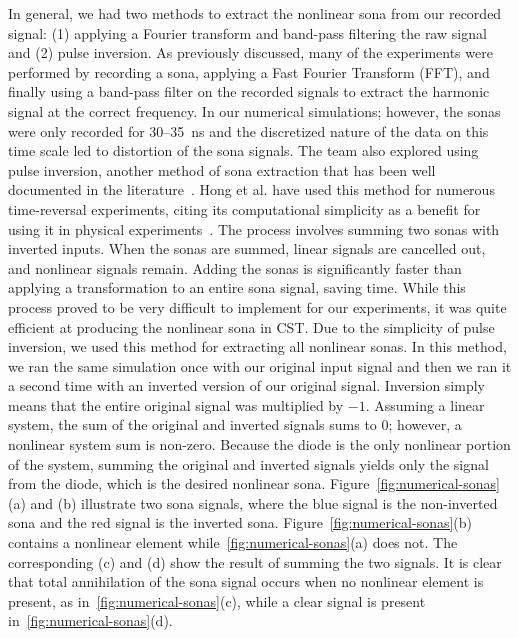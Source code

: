 In general, we had two methods to extract the nonlinear sona from our recorded signal: (1) applying a Fourier transform and band-pass filtering the raw signal and (2) pulse inversion. As previously discussed, many of the \giga experiments were performed by recording a sona, applying a Fast Fourier Transform (FFT), and finally using a band-pass filter on the recorded signals to extract the harmonic signal at the correct frequency. In our numerical simulations; however, the sonas were only recorded for \numrange{30}{35}~ns and the discretized nature of the data on this time scale led to distortion of the sona signals.
The team also explored using pulse inversion, another method of sona extraction that has been well documented in the literature~\cite{simpson_pulse_1999,hong_nonlinear_2014}. Hong et al. have used this method for numerous time-reversal experiments, citing its computational simplicity as a benefit for using it in physical experiments~\cite{hong_nonlinear_2014}. The process involves summing two sonas with inverted inputs.  When the sonas are summed, linear signals are cancelled out, and nonlinear signals remain. Adding the sonas is significantly faster than applying a transformation to an entire sona signal, saving time. While this process proved to be very difficult to implement for our \giga experiments, it was quite efficient at producing the nonlinear sona in CST.
Due to the simplicity of pulse inversion, we used this method for extracting all nonlinear sonas. In this method, we ran the same simulation once with our original input signal and then we ran it a second time with an inverted version of our original signal. Inversion simply means that the entire original signal was multiplied by $-1$. Assuming a linear system, the sum of the original and inverted signals sums to $0$; however, a nonlinear system sum is non-zero. Because the diode is the only nonlinear portion of the system, summing the original and inverted signals yields only the signal from the diode, which is the desired nonlinear sona. Figure~\ref{fig:numerical-sonas}(a) and (b) illustrate two sona signals, where the blue signal is the non-inverted sona and the red signal is the inverted sona. Figure~\ref{fig:numerical-sonas}(b) contains a nonlinear element while~\ref{fig:numerical-sonas}(a) does not. The corresponding (c) and (d) show the result of summing the two signals. It is clear that total annihilation of the sona signal occurs when no nonlinear element is present, as in~\ref{fig:numerical-sonas}(c), while a clear signal is present in~\ref{fig:numerical-sonas}(d).



